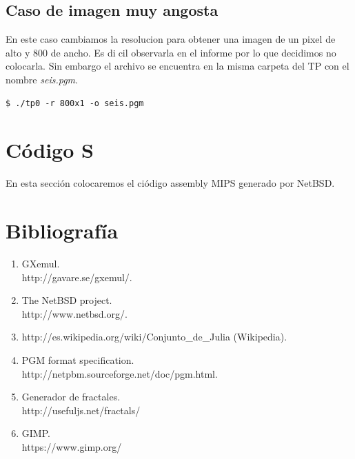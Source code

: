 \documentclass[a4paper,10pt]{article}
\begin{document}
\newpage

\subsection{Caso de imagen muy angosta}
En este caso cambiamos la resolucion para obtener una imagen de un pixel
de alto y 800 de ancho. Es dicil observarla en el informe por lo que decidimos
no colocarla. Sin embargo el archivo se encuentra en la misma carpeta del TP con el nombre \textit{seis.pgm}.

\begin{lstlisting}[frame=single]
$ ./tp0 -r 800x1 -o seis.pgm
\end{lstlisting}

\section{C\'{o}digo S}

En esta secci\'{o}n colocaremos el ci\'{o}digo assembly MIPS generado por NetBSD.



\section{Bibliograf\'{i}a}
\begin{enumerate}
\item GXemul. \\ http://gavare.se/gxemul/.
\item The NetBSD project. \\
	http://www.netbsd.org/.
\item http://es.wikipedia.org/wiki/Conjunto\_de\_Julia (Wikipedia).
\item PGM format specification.\\
	http://netpbm.sourceforge.net/doc/pgm.html.
\item Generador de fractales. \\
	http://usefuljs.net/fractals/
\item GIMP. \\
	https://www.gimp.org/
\end{enumerate}
\end{document}
